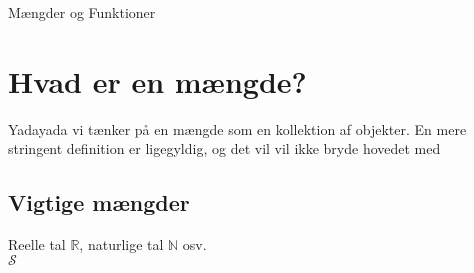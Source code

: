 \documentclass[12pt]{article}
\begin{document}

\begin{center}
\Huge
Mængder og Funktioner
\end{center}
\section*{Hvad er en mængde?}

Yadayada vi tænker på en mængde som en kollektion af objekter. En mere stringent definition er ligegyldig, og det vil vil ikke bryde hovedet med
\subsection*{Vigtige mængder}
Reelle tal $\mathbb{R}$, naturlige tal $\mathbb{N}$ osv.\\
$\mathscr{S}$
\end{document}

